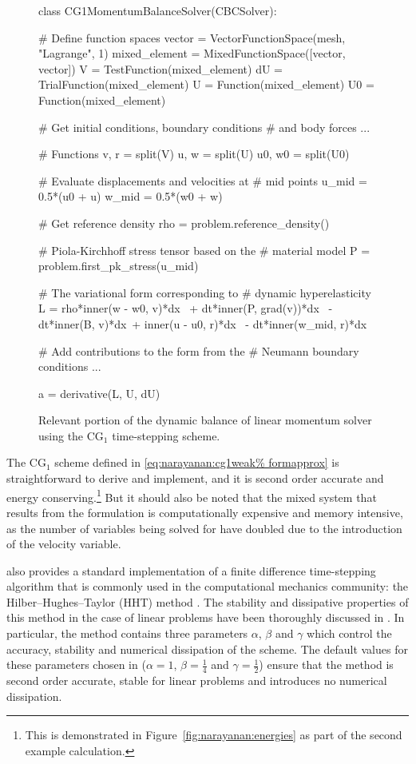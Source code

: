\begin{figure}
\bwfig
\begin{python}
class CG1MomentumBalanceSolver(CBCSolver):

    # Define function spaces
    vector = VectorFunctionSpace(mesh, "Lagrange", 1)
    mixed_element = MixedFunctionSpace([vector,
                                        vector])
    V = TestFunction(mixed_element)
    dU = TrialFunction(mixed_element)
    U = Function(mixed_element)
    U0 = Function(mixed_element)

    # Get initial conditions, boundary conditions
    # and body forces
    ...

    # Functions
    v, r = split(V)
    u, w = split(U)
    u0, w0 = split(U0)

    # Evaluate displacements and velocities at
    # mid points
    u_mid = 0.5*(u0 + u)
    w_mid = 0.5*(w0 + w)

    # Get reference density
    rho = problem.reference_density()

    # Piola-Kirchhoff stress tensor based on the
    # material model
    P = problem.first_pk_stress(u_mid)

    # The variational form corresponding to
    # dynamic hyperelasticity
    L = rho*inner(w - w0, v)*dx \
        + dt*inner(P, grad(v))*dx \
        - dt*inner(B, v)*dx\
        + inner(u - u0, r)*dx \
        - dt*inner(w_mid, r)*dx

    # Add contributions to the form from the
    # Neumann boundary conditions
    ...

    a = derivative(L, U, dU)
\end{python}
\caption{Relevant portion of the dynamic balance of linear momentum
  solver using the CG$_{1}$ time-stepping scheme.}
\label{code:narayanan:cg1}
\end{figure}

The CG$_{1}$ scheme defined in \eqref{eq:narayanan:cg1weak%
formapprox} is straightforward to derive and implement, and it is
second order accurate and energy conserving.\footnote{This is
  demonstrated in Figure~\ref{fig:narayanan:energies} as part of the
  second example calculation.}  But it should also be noted that the mixed
system that results from the formulation is computationally expensive
and memory intensive, as the number of variables being solved for have
doubled due to the introduction of the velocity variable.

\twist{} also provides a standard implementation of a finite
difference time-stepping algorithm that is commonly used in the
computational mechanics community: the Hilber--Hughes--Taylor (HHT)
method \citep{HilberHughesTaylor1977}. The stability and dissipative
properties of this method in the case of linear problems have been
thoroughly discussed in \citet{Hughes1987}. In particular, the method
contains three parameters $\alpha$, $\beta$ and $\gamma$ which control
the accuracy, stability and numerical dissipation of the scheme. The
default values for these parameters chosen in \twist{} ($\alpha = 1$,
$\beta = \frac{1}{4}$ and $\gamma = \frac{1}{2}$) ensure that the
method is second order accurate, stable for linear problems and
introduces no numerical dissipation.

